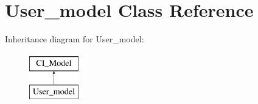 \hypertarget{class_user__model}{}\section{User\+\_\+model Class Reference}
\label{class_user__model}
Inheritance diagram for User\+\_\+model\+:\begin{figure}[H]
\begin{center}
\leavevmode
\includegraphics[height=2.000000cm]{class_user__model}
\end{center}
\end{figure}
